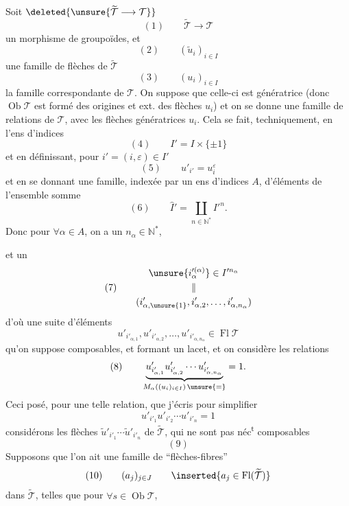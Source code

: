 Soit $\deleted{\unsure{\widetilde{\mathcal T}\longrightarrow\mathcal T}}$
\[(1)\qquad\widetilde{\mathcal T}\longrightarrow\mathcal T\]
un morphisme de groupoïdes, et
\[(2)\qquad(\widetilde u_i)_{i\in I}\]
une famille de flèches de $\widetilde{\mathcal T}$
\[(3)\qquad(u_i)_{i\in I}\]
la famille correspondante de $\mathcal T$. On suppose que celle-ci est génératrice (donc $\operatorname{Ob}\mathcal T$ est formé des origines et ext. des flèches $u_i$) et on se donne une famille de relations  de $\mathcal T$, avec les flèches génératrices $u_i$. Cela se fait, techniquement, en  l'ens d'indices
\[(4)\qquad I'=I\times\{\pm1\}\]
et en définissant, pour $i'=(i,\varepsilon)\in I'$
\[(5)\qquad u'_{i'}=u_i^\varepsilon\]
et en se donnant une famille,  indexée par un ens d'indices $A$, d'éléments de l'ensemble somme
\[(6)\qquad\widehat I'=\coprod_{n\in\mathbb N^*}I'^n.\]
Donc pour $\forall\alpha\in A$, on a un $n_\alpha\in\mathbb N^*$,

et un
\[(7)\qquad\begin{gathered}\unsure{i'^{(\alpha)}_\alpha}\in I'^{n_\alpha}\\\Vert\\(i'_{\alpha,\unsure{1}},i'_{\alpha,2},\ldots,i'_{\alpha,n_\alpha})\end{gathered}\]
d'où une suite d'éléments
\[u'_{i'_{\alpha,1}},u'_{i'_{\alpha,2}},\ldots,u'_{i'_{\alpha,n_\alpha}}\in\operatorname{Fl}\mathcal T\]
qu'on suppose composables,  et formant un lacet,  et on considère les relations
\[(8)\qquad\underbrace{u'_{i'_{\alpha,1}}u'_{i'_{\alpha,2}}\cdots u'_{i'_{\alpha,n_\alpha}}}_{M_\alpha((u_i)_{i\in I})\,\unsure{=}}=1.\]
Ceci posé, pour une telle relation,
que j'écris pour simplifier
\[u'_{i'_1}u'_{i'_2}\cdots u'_{i'_n}=1\]
considérons les flèches 
$\widetilde u'_{i'_1}\cdots\widetilde u'_{i'_n}$ de $\widetilde{\mathcal T}$, qui ne sont pas néc\textsuperscript{t} composables
\[(9)\]
Supposons que l'on ait une famille de ``flèches-fibres'' 
\[(10)\qquad(a_j)_{j\in J}\qquad\inserted{a_j\in\operatorname{Fl}(\widetilde{\mathcal T})}\]
dans $\widetilde{\mathcal T}$, telles que pour $\forall s\in\operatorname{Ob}\mathcal T$,

